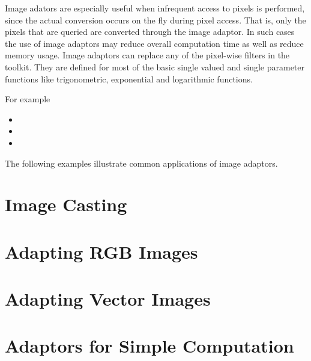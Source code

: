 Image adators are especially useful when infrequent access to pixels is
performed, since the actual conversion occurs on the fly during pixel
access. That is, only the pixels that are queried are converted through the
image adaptor. In such cases the use of image adaptors may reduce overall
computation time as well as reduce memory usage. Image adaptors can replace
any of the pixel-wise filters in the toolkit. They are defined for most of
the basic single valued and single parameter functions like trigonometric,
exponential and logarithmic functions.

For example

\begin{itemize}
\item {}
\item {}
\item {}
\end{itemize}

The following examples illustrate common applications of image adaptors.

\section{Image Casting}
\label{sec:ImageAdaptorForBasicCasting}
\ifitkFullVersion

\fi

\section{Adapting RGB Images}
\label{sec:ImageAdaptorForRGB}
\ifitkFullVersion

\fi


\section{Adapting Vector Images}
\label{sec:ImageAdaptorForVectors}
\ifitkFullVersion

\fi

\section{Adaptors for Simple Computation}
\label{sec:ImageAdaptorForSimpleComputation}
\ifitkFullVersion

\fi




